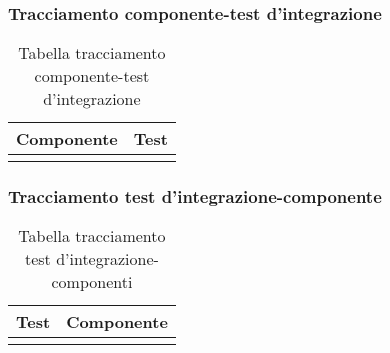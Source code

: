 \subsubsection{Tracciamento componente-test d'integrazione}
\begin{center}
\begin{longtable}{|c|c|}
\toprule
\textbf{Componente} & \textbf{Test}\\
\bottomrule
\caption{Tabella tracciamento componente-test d'integrazione}
\label{tab:changelog}
\end{longtable}
\end{center}
\subsubsection{Tracciamento test d'integrazione-componente}
\begin{center}
\begin{longtable}{|c|c|}
\toprule
\textbf{Test} & \textbf{Componente}\\
\bottomrule
\caption{Tabella tracciamento test d'integrazione-componenti}
\label{tab:changelog}
\end{longtable}
\end{center}


